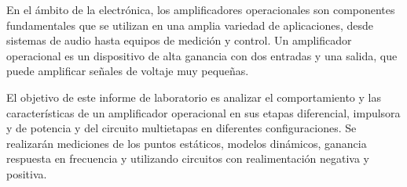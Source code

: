 En el ámbito de la electrónica, los amplificadores operacionales son componentes fundamentales que se utilizan en una amplia variedad de aplicaciones, desde sistemas de audio hasta equipos de medición y control. Un amplificador operacional es un dispositivo de alta ganancia con dos entradas y una salida, que puede amplificar señales de voltaje muy pequeñas.

El objetivo de este informe de laboratorio es analizar el comportamiento y las características de un amplificador operacional en sus etapas diferencial, impulsora y de potencia y del circuito multietapas en diferentes configuraciones. Se realizarán mediciones de los puntos estáticos, modelos dinámicos, ganancia respuesta en frecuencia y utilizando circuitos con realimentación negativa y positiva.  
